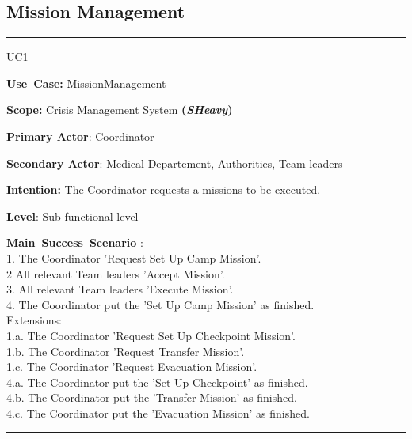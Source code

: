 \subsection{Mission Management}
\vspace{0.5cm}
\hrule
\vspace{0.5cm}
\begin{lyxlist}{UC1}
\small{
\item [\textbf{Use~Case:}] MissionManagement
\item [\textbf{Scope:}] Crisis Management System \textbf{(\emph{SHeavy})}
\item [\textbf{Primary Actor}:] Coordinator
\item [\textbf{Secondary Actor}:] Medical Departement, Authorities, Team leaders
\item [\textbf{Intention:}]The Coordinator requests a missions to be executed.
\item [\textbf{Level}:]Sub-functional level
\item [\textbf{Main~Success~Scenario}]:\\
1. The Coordinator 'Request Set Up Camp Mission'.\\
2  All relevant Team leaders 'Accept Mission'.\\
3. All relevant Team leaders 'Execute Mission'.\\
4. The Coordinator put the 'Set Up Camp Mission' as finished.\\
Extensions:\\
	1.a. The Coordinator 'Request Set Up Checkpoint Mission'.\\
	1.b. The Coordinator 'Request Transfer Mission'.\\
	1.c. The Coordinator 'Request Evacuation Mission'.\\
	4.a. The Coordinator put the 'Set Up Checkpoint' as finished.\\
	4.b. The Coordinator put the 'Transfer Mission' as finished.\\
	4.c. The Coordinator put the 'Evacuation Mission' as finished.\\
	
}
\end{lyxlist}
\hrule 
\vspace{0.5cm} 

